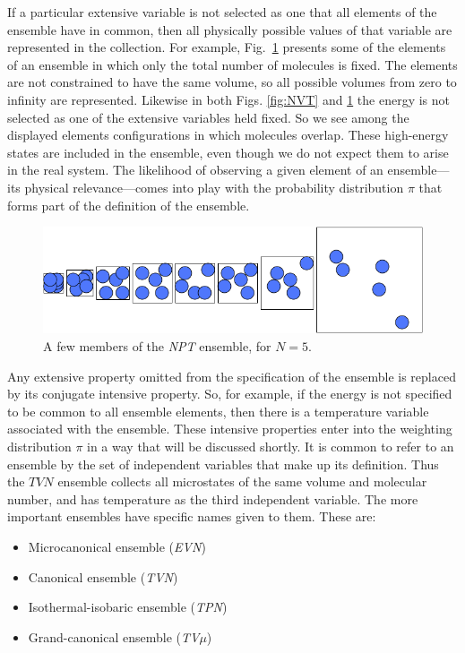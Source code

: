 \documentclass[9pt,bestpractices]{molsim}
\begin{document}
If a particular extensive variable is not selected as one that all
elements of the ensemble have in common, then all physically possible
values of that variable are represented in the collection. For example,
Fig.~\ref{fig:NPT} presents some of the elements of an ensemble in which
only the total number of molecules is fixed. The elements are not
constrained to have the same volume, so all possible volumes from zero
to infinity are represented. Likewise in both Figs. \ref{fig:NVT} and \ref{fig:NPT} the
energy is not selected as one of the extensive variables held fixed. So we
see among the displayed elements configurations in which molecules
overlap. These high-energy states are included in the ensemble, even
though we do not expect them to arise in the real system. The likelihood
of observing a given element of an ensemble---its physical
relevance---comes into play with the probability distribution $\pi$ that
forms part of the definition of the ensemble.
\begin{figure}
\includegraphics[width=\textwidth]{Statmech_figures/image111}
\caption{\label{fig:NPT}A few members of the \emph{NPT} ensemble, for $N = 5$.}
\end{figure}


Any extensive property omitted from the specification of the ensemble is
replaced by its conjugate intensive property. So, for example, if the
energy is not specified to be common to all ensemble elements, then
there is a temperature variable associated with the ensemble. These
intensive properties enter into the weighting distribution $\pi$ in a way
that will be discussed shortly. It is common to refer to an ensemble by
the set of independent variables that make up its definition. Thus the
$TVN$ ensemble collects all microstates of the same volume and molecular
number, and has temperature as the third independent variable. The more
important ensembles have specific names given to them. These are:

\begin{itemize}
\item
  Microcanonical ensemble (\emph{EVN})
\item
  Canonical ensemble (\emph{TVN})
\item
  Isothermal-isobaric ensemble (\emph{TPN})
\item
  Grand-canonical ensemble (\emph{TV$\mu$})
\end{itemize}
\end{document}
